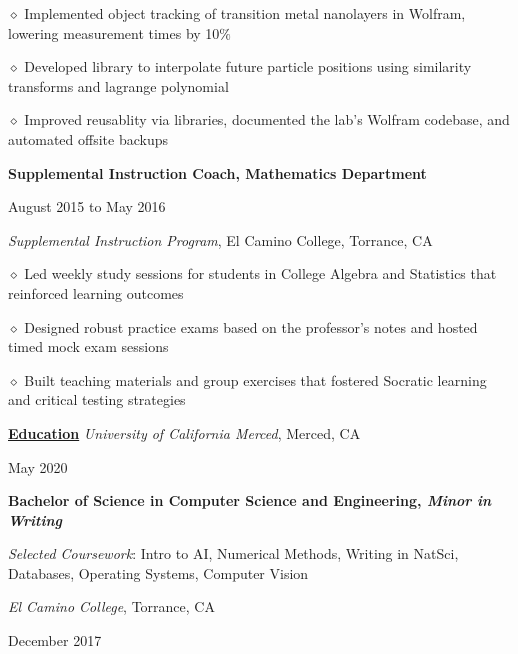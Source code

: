 \documentclass [11pt]{article}
\begin{document}
\begin{flushleft}
‭‭\quad\quad\quad$\diamond$ ‭Implemented object tracking of transition metal nanolayers in Wolfram, lowering measurement times by 10$\%$

‭‭\quad\quad\quad$\diamond$ Developed library to interpolate future particle positions using similarity transforms and lagrange polynomial

‭‭\quad\quad\quad$\diamond$ Improved reusablity via libraries, documented the lab’s Wolfram codebase, and automated offsite backups

\linebreak
\textbf{Supplemental Instruction Coach, Mathematics Department}\begin{minipage}{0.475 \linewidth}\begin{flushright}August 2015 to May 2016\end{flushright}\end{minipage}
\emph{Supplemental Instruction Program}, El Camino College, Torrance, CA

‭‭\quad\quad\quad$\diamond$ ‭Led weekly study sessions for students in College Algebra and Statistics that reinforced learning outcomes

‭‭\quad\quad\quad$\diamond$ Designed robust practice exams based on the professor's notes and hosted timed mock exam sessions

‭‭\quad\quad\quad$\diamond$ Built teaching materials and group exercises that fostered Socratic learning and critical testing strategies

\linebreak

\vspace{7}
\underline{\textbf{Education}}
\linebreak
\emph{University of California Merced}, Merced, CA\begin{minipage}{0.63 \linewidth}\begin{flushright}May 2020\end{flushright}\end{minipage}
\textbf{Bachelor of Science in Computer Science and Engineering, \emph{Minor in Writing}}

\raggedleft
\emph{Selected Coursework}: Intro to AI, Numerical Methods, Writing in NatSci, Databases, Operating Systems, Computer Vision
\normalsize
\linebreak
\raggedright
\emph{El Camino College}, Torrance, CA\begin{minipage}{0.725 \linewidth}\begin{flushright}December 2017\end{flushright}\end{minipage}


\end{flushleft}
\end{document}
